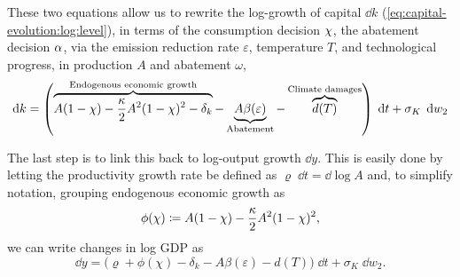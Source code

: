 \documentclass[../../main.tex]{subfiles}
\begin{document}
These two equations allow us to rewrite the log-growth of capital $\dd{k}$ (\ref{eq:capital-evolution:log:level}), in terms of the consumption decision $\chi$, the abatement decision $\alpha$, via the emission reduction rate $\varepsilon$, temperature $T$, and technological progress, in production $A$ and abatement $\omega$, \begin{equation} \label{eq:capital-evolution:log:growth}
    \dd{k} = \left( \overbrace{A (1 - \chi) - \frac{\kappa}{2} A^2 (1 - \chi)^2 - \delta_k}^{\text{Endogenous economic growth}} - \underbrace{A \beta(\varepsilon)}_{\text{Abatement}} - \overbrace{d(T)}^{\text{Climate damages}} \right) \; \dd{t} + \sigma_K \; \dd{w_2}
\end{equation} 

The last step is to link this back to log-output growth $\dd{y}$. This is easily done by letting the productivity growth rate be defined as $\varrho \; \dd{t} = \dd{\log A}$ and, to simplify notation, grouping endogenous economic growth as \begin{equation}
    \phi(\chi) \coloneqq A (1 - \chi) - \frac{\kappa}{2} A^2 (1 - \chi)^2,
\end{equation} we can write changes in log GDP as \begin{equation} \label{eq:output-evolution:log}
    \dd{y} = \Big(\varrho + \phi(\chi) - \delta_k - A \beta(\varepsilon) - d(T) \Big) \; \dd{t} + \sigma_K \; \dd{w_2}.
\end{equation}
\end{document}
